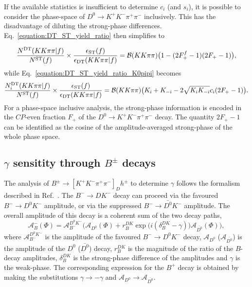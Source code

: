 \documentclass[12pt, a4paper, notitlepage, onecolumn]{article}
\begin{document}
If the available statistics is insufficient to determine $c_i$ (and $s_i$), it is possible to consider the phase-space of $D^0\to K^+K^-\pi^+\pi^-$ inclusively. This has the disadvantage of diluting the strong-phase differences. Eq.~\eqref{equation:DT_ST_yield_ratio} then simplifies to

\begin{equation}
    \frac{N^{\rm DT}(KK\pi\pi | f)}{N^{\rm ST}(f)}\times\frac{\epsilon_{\rm ST}(f)}{\epsilon_{\rm DT}(KK\pi\pi | f)} = \mathcal{B}(KK\pi\pi)\big(1 - (2F_+^{f} - 1)(2F_+ - 1)\big),
    \label{equation:DT_ST_yield_ratio_FPlus}
\end{equation}
while Eq.~\eqref{equation:DT_ST_yield_ratio_K0pipi} becomes
\begin{equation}
    \frac{N_i^{\rm DT}(KK\pi\pi | f)}{N^{\rm ST}(f)}\times\frac{\epsilon_{\rm ST}(f)}{\epsilon_{\rm DT}(KK\pi\pi | f)} = \mathcal{B}(KK\pi\pi)\big(K_i + K_{-i} - 2\sqrt{K_iK_{-i}}c_i(2F_+ - 1)\big).
    \label{equation:DT_ST_yield_ratio_K0pipi_FPlus}
\end{equation}
For a phase-space inclusive analysis, the strong-phase information is encoded in the $C\!P$-even fraction $F_+$ of the $D^0\to K^+K^-\pi^+\pi^-$ decay. The quantity $2F_+ - 1$ can be identified as the cosine of the amplitude-averaged strong-phase of the whole phase space.

\subsection{\texorpdfstring{$\gamma$}{gamma} sensitity through \texorpdfstring{$B^\pm$}{B} decays}
\noindent The analysis of $B^\pm\to[K^+K^-\pi^+\pi^-]_Dh^\pm$ to determine $\gamma$ follows the formalism described in Ref.~\cite{LHCb-PAPER-2020-019}. The $B^-\to DK^-$ decay can proceed via the favoured $B^-\to D^0K^-$ amplitude, or via the suppressed $B^-\to\bar{D^0}K^-$ amplitude. The overall amplitude of this decay is a coherent sum of the two decay paths,
\begin{equation}
    \mathcal{A}_B^-(\Phi) = \mathcal{A}_{B^-}^{D^0K^-}\Big(\mathcal{A}_{D^0}(\Phi) + r_B^{DK}\exp\big(i(\delta_B^{DK} - \gamma)\big)\mathcal{A}_{\bar{D^0}}(\Phi)\Big),
    \label{equation:Bpm_amplitude}
\end{equation}
where $\mathcal{A}_{B^-}^{D^0K^-}$ is the amplitude of the favoured $B^-\to D^0 K^-$ decay, $\mathcal{A}_{D^0}$ ($\mathcal{A}_{\bar{D^0}}$) is the amplitude of the $D^0$ ($\bar{D^0}$) decay, $r_B^{DK}$ is the magnitude of the ratio of the $B$-decay amplitudes, $\delta_B^{DK}$ is the strong-phase difference of the amplitudes and $\gamma$ is the weak-phase. The corresponding expression for the $B^+$ decay is obtained by making the substitutions $\gamma\to -\gamma$ and $\mathcal{A}_{D^0}\to\mathcal{A}_{\bar{D^0}}$.
\end{document}
